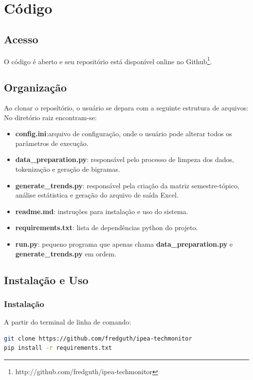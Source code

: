 \documentclass[paper=a4, fontsize=11pt]{scrartcl}
\numberwithin{equation}{section}		%
\numberwithin{figure}{section}			%
\numberwithin{table}{section}				%
\begin{document}
\section{Código}
\subsection{Acesso}
O código é aberto e seu repositório está disponível online no Github\footnote{http://github.com/fredguth/ipea-techmonitor}.
\subsection{Organização}
Ao clonar o reposítório, o usuário se depara com a seguinte estrutura de arquivos:
\vspace{.7cm}
No diretório raiz encontram-se:
\begin{itemize}
	\item \textbf{config.ini}:arquivo de configuração, onde o usuário pode alterar todos os parâmetros de execução.
	\item \textbf{data\_preparation.py}: responsável pelo processo de limpeza dos dados, tokenização e geração de bigramas.
	\item \textbf{generate\_trends.py}: responsável pela criação da matriz semestre-tópico, análise estátistica e geração do arquivo de saída Excel.
	\item \textbf{readme.md}: instruções para instalação e uso do sistema.
	\item \textbf{requirements.txt}: lista de dependências python do projeto. 
	\item \textbf{run.py}: pequeno programa que apenas chama \textbf{data\_preparation.py} e \textbf{generate\_trends.py} em ordem.
\end{itemize}	
\subsection{Instalação e Uso}

\subsubsection{Instalação}
A partir do terminal de linha de comando:
\begin{lstlisting}[language=bash, frame=leftline, basicstyle=\footnotesize\ttfamily] 
git clone https://github.com/fredguth/ipea-techmonitor
pip install -r requirements.txt
\end{lstlisting}
\end{document}
